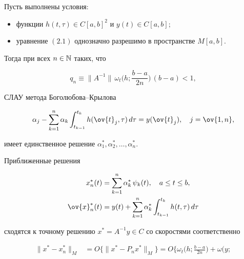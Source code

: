 \begin{thms}


Пусть выполнены условия\/${:}$


\begin{itemize}


\item[а)] функции $h(t,\tau)\in C[a,b]^2$ и $y(t)\in C[a,b];$


\item[б)] уравнение $(2.1)$ однозначно разрешимо в пространстве $M[a,b]$.


\end{itemize}


Тогда при всех $n\in \Bbb N$ таких, что


\begin{equation}


q_n\equiv \|A^{-1}\|\, \omega_t\bigg(h;\frac{b-a}{2n}\bigg)\, (b-a)<1,


\end{equation}


СЛАУ метода Боголюбова--Крылова


\begin{equation}


\alpha_j-\sum_{k=1}^n\alpha_k\intl_{t_{k-1}}^{t_k}h(\ov{t}_j,\tau)


\, d\tau =y(\ov{t}_j),\quad j=\ov{1,n},


\end{equation}


имеет единственное решение $\alpha_1^*,\alpha_2^*,\dotsc ,\alpha_n^*$.


Приближенные решения


\begin{align}


x_n^*(t)&=\sum_{k=1}^n\alpha_k^*\, \psi_k(t),\quad a\leq t\leq b, \\


%


\ov{x}_n^*(t)&=y(t)+\sum_{k=1}^n\alpha_k^* \intl_{t_{k-1}}^{t_k}


h(t,\tau)\, d\tau 


\end{align}


сходятся к точному решению $x^*=A^{-1}y\in C$ со скоростями соответственно


\begin{align}


\|x^*-x_n^*\|_M&=O\bigl\{\|x^* -P_nx^*\|_M\bigr\}=


O\bigg\{\omega_t\bigg(h;\frac{b-a}{2n}\bigg)+ \omega\bigg(y;



\end{align}
\end{thms}
